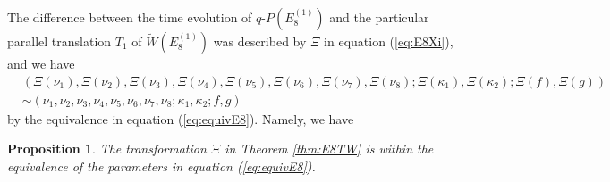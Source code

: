 \documentclass[12pt]{amsart}
\numberwithin{equation}{section}
\newtheorem{prop}{\bf Proposition}[section]
\theoremstyle{definition}
\begin{document}
The difference between the time evolution of $q$-$P(E^{(1)}_8)$ and the particular parallel translation $T_1$ of $\widetilde{W}(E^{(1)}_{8})$ was described by $\Xi $ in equation (\ref{eq:E8Xi}), and we have
\begin{align}
& ( \Xi (\nu_1) , \Xi (\nu_2 ) , \Xi (\nu_3 ) , \Xi (\nu_4 ) , \Xi (\nu_5 ) , \Xi (\nu_6 ) , \Xi (\nu_7 ) , \Xi (\nu_8 ) ; \Xi (\kappa_1) , \Xi (\kappa_2 ) ; \Xi (f ) , \Xi (g ) )  \\ 
& \sim (\nu_1 , \nu_2 , \nu_3 , \nu_4 ,\nu_5 ,\nu_6 , \nu_7 ,\nu_8 ;\kappa_1 ,\kappa_2 ; f ,g ) \nonumber
\end{align}
by the equivalence in equation (\ref{eq:equivE8}).
Namely, we have
\begin{prop}
The transformation $\Xi $ in Theorem \ref{thm:E8TW} is within the equivalence of the parameters in equation (\ref{eq:equivE8}).
\end{prop}

\appendix
\end{document}
